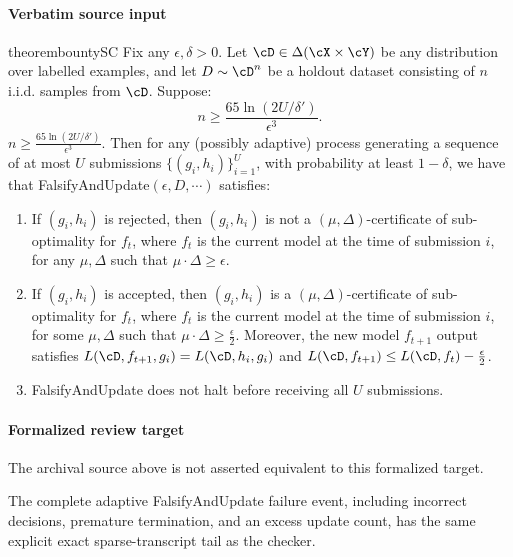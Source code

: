 \documentclass[10pt]{article}
\begin{document}
\paragraph{Verbatim source input}
\begin{ReviewVerbatim}
\begin{restatable}{theorem}{bountySC}
\label{thm:bounty-SC}
Fix any $\epsilon,\delta > 0$. Let $\cD \in \Delta(\cX \times \cY)$ be any distribution over labelled examples, and let $D \sim \cD^n$ be a holdout dataset consisting of $n$ i.i.d. samples from $\cD$. Suppose:
\ifdraft
$$n \geq \frac{65 \ln(2U/\delta')}{\epsilon^3}.$$
\else $n \geq \frac{65 \ln(2U/\delta')}{\epsilon^3}.$ \fi
Then for any (possibly adaptive) process generating a sequence of at most $U$ submissions $\{(g_i,h_i)\}_{i=1}^U$, with probability at least $1-\delta$, we have that FalsifyAndUpdate$(\epsilon,D,\cdots)$ satisfies:
\begin{enumerate}
    \item If $(g_i,h_i)$ is rejected, then $(g_i,h_i)$ is not a $(\mu,\Delta)$-certificate of sub-optimality for $f_t$, where $f_t$ is the current model at the time of submission $i$, for any $\mu, \Delta$ such that $\mu\cdot \Delta \geq \epsilon$.
    \item If $(g_i,h_i)$ is accepted, then $(g_i,h_i)$ is a $(\mu,\Delta)$-certificate of sub-optimality for $f_t$, where $f_t$ is the current model at the time of submission $i$, for some $\mu, \Delta$ such that $\mu\cdot \Delta \geq \frac{\epsilon}{2}$. Moreover, the new model $f_{t+1}$ output satisfies $L(\cD,f_{t+1}, g_i) = L(\cD, h_i, g_i)$ and $L(\cD,f_{t+1}) \leq L(\cD,f_t) - \frac{\epsilon}{2}$.
    \item FalsifyAndUpdate does not halt before receiving all $U$ submissions.
\end{enumerate}
\end{restatable}
\end{ReviewVerbatim}


\paragraph{Formalized review target}
The archival source above is not asserted equivalent to this formalized target.
\begin{ReviewVerbatim}
The complete adaptive FalsifyAndUpdate failure event, including incorrect decisions, premature termination, and an excess update count, has the same explicit exact sparse-transcript tail as the checker.
\end{ReviewVerbatim}
\end{document}
